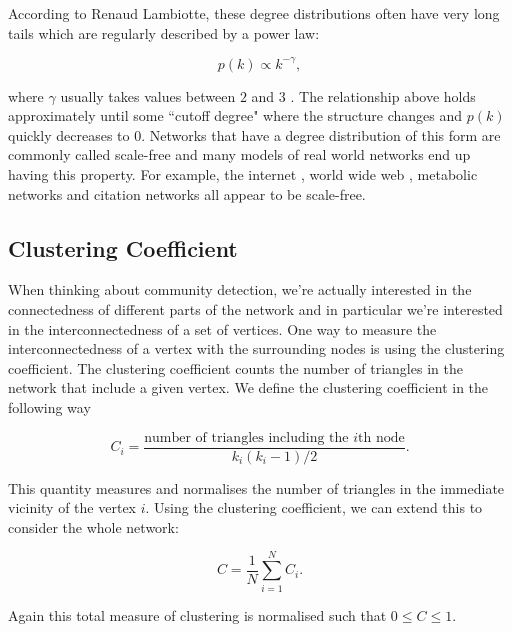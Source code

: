 According to Renaud Lambiotte, these degree distributions often have very long tails which are regularly described by a power law:

$$ p(k) \propto k^{-\gamma}, $$

where $\gamma$ usually takes values between $2$ and $3$ \cite[16]{oxford:renaud_notes}. The relationship above holds approximately until some ``cutoff degree" where the structure changes and $p(k)$ quickly decreases to $0$. Networks that have a degree distribution of this form are commonly called scale-free and many models of real world networks end up having this property. For example, the internet \cite{PhysRevE.65.066130}, world wide web \cite{BARABASI200069}, metabolic networks \cite{Jeong2000} and citation networks \cite{Redner1998} all appear to be scale-free.

\subsection{Clustering Coefficient}
When thinking about community detection, we're actually interested in the connectedness of different parts of the network and in particular we're interested in the interconnectedness of a set of vertices. One way to measure the interconnectedness of a vertex with the surrounding nodes is using the clustering coefficient. The clustering coefficient counts the number of triangles in the network that include a given vertex. We define the clustering coefficient in the following way

$$ C_i = \frac{\text{number of triangles including the }i\text{th node}}{k_i(k_i-1)/2}. $$

This quantity measures and normalises the number of triangles in the immediate vicinity of the vertex $i$. Using the clustering coefficient, we can extend this to consider the whole network:

$$ C = \frac{1}{N}\sum_{i=1}^NC_i. $$

Again this total measure of clustering is normalised such that $0 \leq C \leq 1$.

